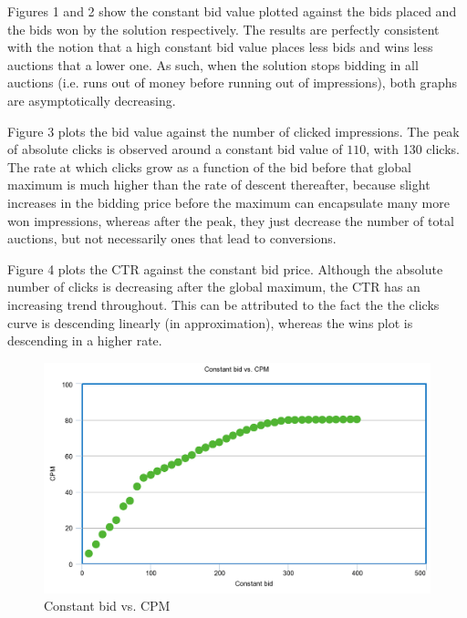 \documentclass{sig-alternate-05-2015}
\begin{document}
Figures 1 and 2 show the constant bid value plotted against the bids placed and the bids won by the solution respectively. The results are perfectly consistent with the notion that a high constant bid value places less bids and wins less auctions that a lower one. As such, when the solution stops bidding in all auctions (i.e. runs out of money before running out of impressions), both graphs are asymptotically decreasing.

Figure 3 plots the bid value against the number of clicked impressions. The peak of absolute clicks is observed around a constant bid value of $110$, with 130 clicks. The rate at which clicks grow as a function of the bid before that global maximum is much higher than the rate of descent thereafter, because slight increases in the bidding price before the maximum can encapsulate many more won impressions, whereas after the peak, they just decrease the number of total auctions, but not necessarily ones that lead to conversions.

Figure 4 plots the CTR against the constant bid price. Although the absolute number of clicks is decreasing after the global maximum, the CTR has an increasing trend throughout. This can be attributed to the fact the the clicks curve is descending linearly (in approximation), whereas the wins plot is descending in a higher rate.

\begin{figure}
  \includegraphics[width=\linewidth]{constant_cpm.png}
  \caption{Constant bid vs. CPM}
  \label{fig:CPM}
\end{figure}
\end{document}

